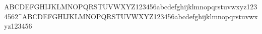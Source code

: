 ABCDEFGHIJKLMNOPQRSTUVWXYZ123456abcdefghijklmnopqrstuvwxyz1234562^{ABCDEFGHIJKLMNOPQRSTUVWXYZ123456abcdefghijklmnopqrstuvwxyz123456}
